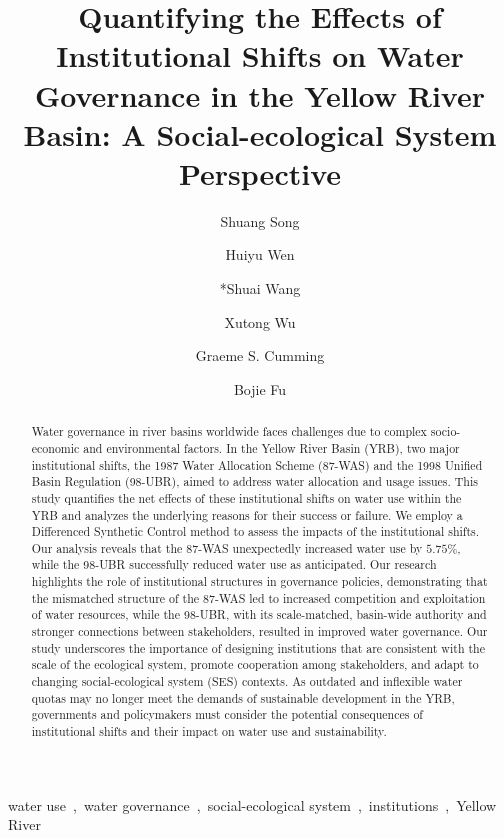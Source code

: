 \documentclass[preprint, 12pt]{elsarticle}
\begin{document}
\begin{frontmatter}

\title{Quantifying the Effects of Institutional Shifts on Water Governance in the Yellow River Basin: A Social-ecological System Perspective}


\author[inst1]{Shuang Song}
\author[inst2]{Huiyu Wen}
\author[inst1]{*Shuai Wang}
\author[inst1]{Xutong Wu}

\author[inst3]{Graeme S. Cumming}
\author[inst1]{Bojie Fu}







\begin{abstract}
     Water governance in river basins worldwide faces challenges due to complex socio-economic and environmental factors. In the Yellow River Basin (YRB), two major institutional shifts, the 1987 Water Allocation Scheme (87-WAS) and the 1998 Unified Basin Regulation (98-UBR), aimed to address water allocation and usage issues. This study quantifies the net effects of these institutional shifts on water use within the YRB and analyzes the underlying reasons for their success or failure.
     We employ a Differenced Synthetic Control method to assess the impacts of the institutional shifts. Our analysis reveals that the 87-WAS unexpectedly increased water use by $5.75\%$, while the 98-UBR successfully reduced water use as anticipated. Our research highlights the role of institutional structures in governance policies, demonstrating that the mismatched structure of the 87-WAS led to increased competition and exploitation of water resources, while the 98-UBR, with its scale-matched, basin-wide authority and stronger connections between stakeholders, resulted in improved water governance.
     Our study underscores the importance of designing institutions that are consistent with the scale of the ecological system, promote cooperation among stakeholders, and adapt to changing social-ecological system (SES) contexts. As outdated and inflexible water quotas may no longer meet the demands of sustainable development in the YRB, governments and policymakers must consider the potential consequences of institutional shifts and their impact on water use and sustainability.
\end{abstract}



\begin{keyword}
     water use~\sep~water governance~\sep~social-ecological system~\sep~institutions~\sep~Yellow River
\end{keyword}

\end{frontmatter}
\newpage
\linenumbers
\end{document}
